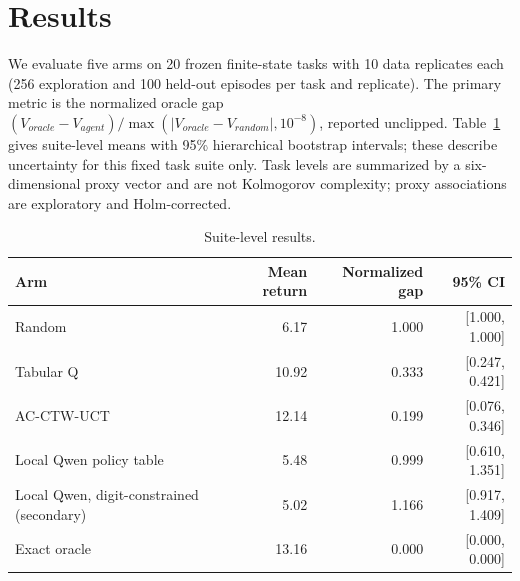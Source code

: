 \section{Results}
We evaluate five arms on 20 frozen finite-state tasks with 10 data replicates each (256 exploration and 100 held-out
episodes per task and replicate). The primary metric is the normalized oracle gap
$(V_{oracle}-V_{agent})/\max(|V_{oracle}-V_{random}|,10^{-8})$, reported unclipped.
Table~\ref{tab:suite} gives suite-level means with 95\% hierarchical bootstrap intervals; these describe uncertainty
for this fixed task suite only. Task levels are summarized by a six-dimensional proxy vector and are not Kolmogorov
complexity; proxy associations are exploratory and Holm-corrected.
\begin{table}[h]
\centering
\begin{tabular}{lrrr}
Arm & Mean return & Normalized gap & 95\% CI \\
\hline
Random & 6.17 & 1.000 & [1.000, 1.000] \\
Tabular Q & 10.92 & 0.333 & [0.247, 0.421] \\
AC-CTW-UCT & 12.14 & 0.199 & [0.076, 0.346] \\
Local Qwen policy table & 5.48 & 0.999 & [0.610, 1.351] \\
Local Qwen, digit-constrained (secondary) & 5.02 & 1.166 & [0.917, 1.409] \\
Exact oracle & 13.16 & 0.000 & [0.000, 0.000] \\
\end{tabular}
\caption{Suite-level results.}
\label{tab:suite}
\end{table}

